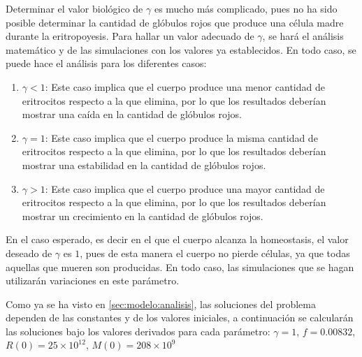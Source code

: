 Determinar el valor biológico de $\gamma$ es mucho más complicado, pues no ha sido posible determinar la cantidad de glóbulos rojos que produce una célula madre durante la eritropoyesis. Para hallar un valor adecuado de $\gamma$, se hará el análisis matemático y de las simulaciones con los valores ya establecidos. En todo caso, se puede hace el análisis para los diferentes casos:
\begin{enumerate}
    \item  $\gamma<1$: Este caso implica que el cuerpo produce una menor cantidad de eritrocitos respecto a la que elimina, por lo que los resultados deberían mostrar una caída en la cantidad de glóbulos rojos.
    \item $\gamma=1$: Este caso implica que el cuerpo produce la misma cantidad de eritrocitos respecto a la que elimina, por lo que los resultados deberían mostrar una estabilidad en la cantidad de glóbulos rojos.
    \item  $\gamma>1$: Este caso implica que el cuerpo produce una mayor cantidad de eritrocitos respecto a la que elimina, por lo que los resultados deberían mostrar un crecimiento en la cantidad de glóbulos rojos.
\end{enumerate}

En el caso esperado, es decir en el que el cuerpo alcanza la homeostasis, el valor deseado de $\gamma$ es $1$, pues de esta manera el cuerpo no pierde células, ya que todas aquellas que mueren son producidas. En todo caso, las simulaciones que se hagan utilizarán variaciones en este parámetro.

Como ya se ha visto en \ref{sec:modelo:analisis}, las soluciones del problema dependen de las constantes y de los valores iniciales, a continuación se calcularán las soluciones bajo los valores derivados para cada parámetro: $\gamma = 1$, $f = 0.00832$, $R(0)=25\times 10^{12}$, $M(0)=208\times 10^{9}$ 

